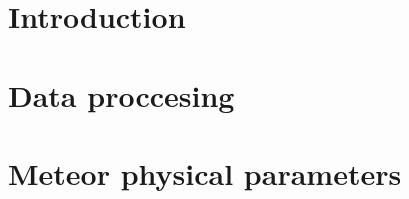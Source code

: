 \documentclass[times,twocolumn,final,authoryear]{elsarticle}
\begin{document}
\section{Introduction}
\label{sec1}








\section{Data proccesing}
\label{sec:methodology}


\section{Meteor physical parameters}
\label{sec:physical-properties}

\end{document}
